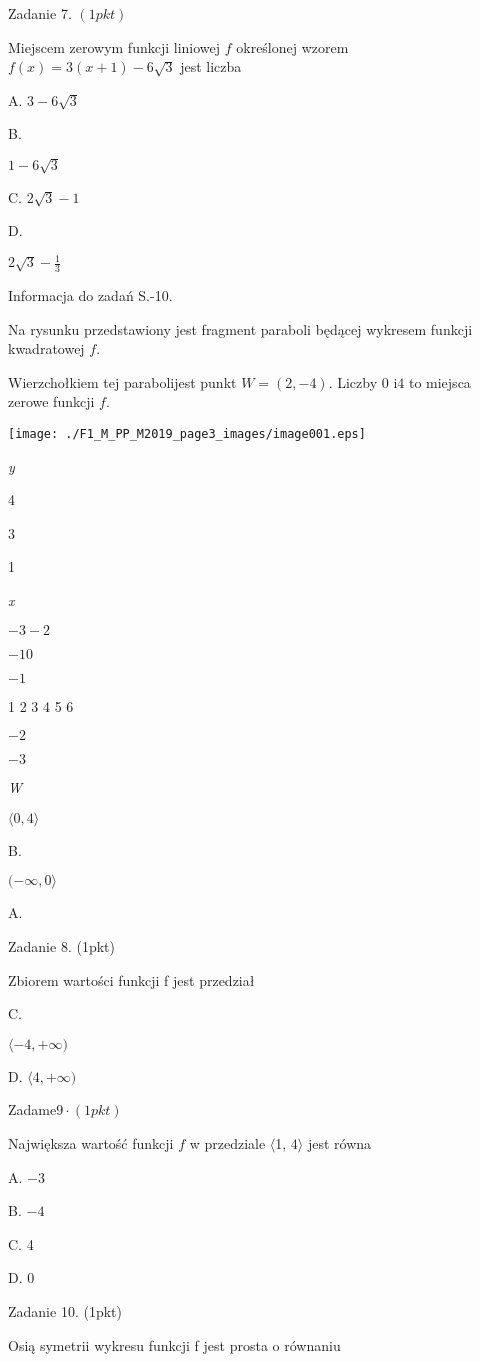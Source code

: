 \documentclass[a4paper,12pt]{article}
\begin{document}
Zadanie 7. $(1pkt)$

Miejscem zerowym funkcji liniowej $f$ określonej wzorem $f(x)=3(x+1)-6\sqrt{3}$ jest liczba

A. $3-6\sqrt{3}$

B.

$1-6\sqrt{3}$

C. $2\sqrt{3}-1$

D.

$2\displaystyle \sqrt{3}-\frac{1}{3}$

Informacja do zadań S.-10.

Na rysunku przedstawiony jest fragment paraboli będącej wykresem funkcji kwadratowej $f.$

Wierzchołkiem tej parabolijest punkt $W=(2,-4)$. Liczby 0 $\mathrm{i}4$ to miejsca zerowe funkcji $f.$
\begin{center}
\texttt{[image: ./F1\_M\_PP\_M2019\_page3\_images/image001.eps]}
\end{center}
{\it y}

4

3

1

{\it x}

$-3 -2$

$-1 0$

$-1$

1 2 3 4  5 6

$-2$

$-3$

{\it W}

$\langle 0,  4\rangle$

B.

$(-\infty,  0\rangle$

A.

Zadanie 8. (1pkt)

Zbiorem wartości funkcji f jest przedział

C.

$\langle-4, +\infty)$

D. $\langle 4, +\infty)$

Zadam$\mathrm{e}9\cdot(1pkt)$

Największa wartość funkcji $f$ w przedziale $\langle$1, $ 4\rangle$ jest równa

A. $-3$

B. $-4$

C. 4

D. 0

Zadanie 10. (1pkt)

Osią symetrii wykresu funkcji f jest prosta o równaniu
\end{document}
